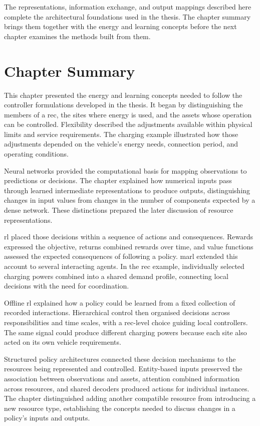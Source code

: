 The representations, information exchange, and output mappings described here complete the architectural foundations used in the thesis. The chapter summary brings them together with the energy and learning concepts before the next chapter examines the methods built from them.

\FloatBarrier
\section{Chapter Summary}
\label{sec:ch2-summary}

This chapter presented the energy and learning concepts needed to follow the controller formulations developed in the thesis. It began by distinguishing the members of a \gls{rec}, the sites where energy is used, and the assets whose operation can be controlled. Flexibility described the adjustments available within physical limits and service requirements. The charging example illustrated how those adjustments depended on the vehicle's energy needs, connection period, and operating conditions.

Neural networks provided the computational basis for mapping observations to predictions or decisions. The chapter explained how numerical inputs pass through learned intermediate representations to produce outputs, distinguishing changes in input values from changes in the number of components expected by a dense network. These distinctions prepared the later discussion of resource representations.

\gls{rl} placed those decisions within a sequence of actions and consequences. Rewards expressed the objective, returns combined rewards over time, and value functions assessed the expected consequences of following a policy. \gls{marl} extended this account to several interacting agents. In the \gls{rec} example, individually selected charging powers combined into a shared demand profile, connecting local decisions with the need for coordination.

Offline \gls{rl} explained how a policy could be learned from a fixed collection of recorded interactions. Hierarchical control then organised decisions across responsibilities and time scales, with a \gls{rec}-level choice guiding local controllers. The same signal could produce different charging powers because each site also acted on its own vehicle requirements.

Structured policy architectures connected these decision mechanisms to the resources being represented and controlled. Entity-based inputs preserved the association between observations and assets, attention combined information across resources, and shared decoders produced actions for individual instances. The chapter distinguished adding another compatible resource from introducing a new resource type, establishing the concepts needed to discuss changes in a policy's inputs and outputs.

